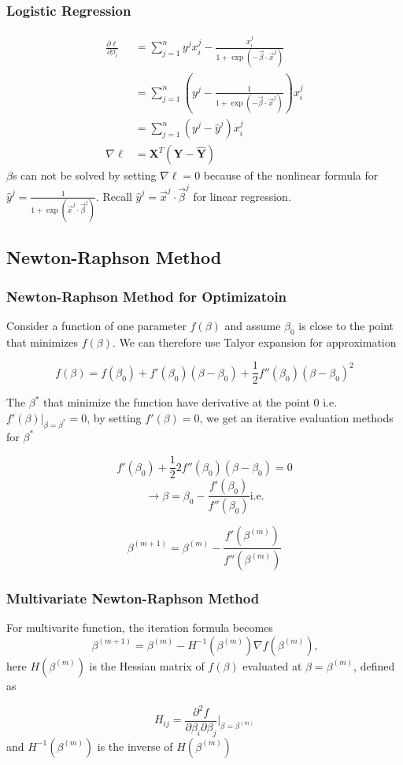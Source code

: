 \documentclass[notheorems, aspectratio=54]{beamer}
\begin{document}
\begin{frame}

\frametitle{Logistic Regression}
\begin{align*}
\frac{\partial\ell}{\partial\beta_i}
&=\sum_{j=1}^{n}y^jx_{i}^{j}-\frac{x_{i}^j}{1+\exp(-\vec{\beta}\cdot\vec{x}^j)}\\
&=\sum_{j=1}^{n}\left (y^j-\frac{1}{1+\exp(-\vec{\beta}\cdot\vec{x}^j)} \right ) x_{i}^{j}\\
&=\sum_{j=1}^{n}\left (y^j-\hat{y}^j \right ) x_{i}^{j}\\
\nabla\ell&=\textbf{X}^T(\textbf{Y}-\hat{\textbf{Y}})
\end{align*}
$\beta$s can not be solved by setting $\nabla\ell=0$ because of the nonlinear formula for $\hat{y}^j=\frac{1}{1+\exp(\vec{x}^j\cdot\vec{\beta}^j)}$. Recall $\hat{y}^j=\vec{x}^j\cdot\vec{\beta}^j$ for linear regression.
\end{frame}

\begin{frame}

\subsection{Newton-Raphson Method}

\frametitle{Newton-Raphson Method for Optimizatoin}
Consider a function of one parameter $f(\beta)$ and assume $\beta_0$ is close to the point that minimizes $f(\beta)$. We can therefore use Talyor expansion for approximation

$$
f(\beta)=f(\beta_0)+f'(\beta_0)(\beta-\beta_0)+\frac{1}{2}f''(\beta_0)(\beta-\beta_0)^2
$$

The $\beta^*$ that minimize the function have derivative at the point 0 i.e. $f'(\beta)|_{\beta=\beta^*}=0$, by setting $f'(\beta)=0$, we get an iterative evaluation methods for $\beta^*$

$$
f'(\beta_0)+\frac{1}{2}2f''(\beta_0)(\beta-\beta_0)=0 
$$
$$
\rightarrow
\beta=\beta_0-\frac{f'(\beta_0)}{f''(\beta_0)} \text{i.e.}
$$

$$
\beta^{(m+1)}=\beta^{(m)}-\frac{f'(\beta^{(m)})}{f''(\beta^{(m)})}
$$
\end{frame}

\begin{frame}
\frametitle{Multivariate Newton-Raphson Method }
For multivarite function, the iteration formula becomes
$$
\beta^{(m+1)}=\beta^{(m)}-H^{-1}(\beta^{(m)})\nabla f(\beta^{(m)})\text{,}
$$
here $H(\beta^{(m)})$ is the Hessian matrix of $f(\beta)$ evaluated at $\beta=\beta^{(m)}$, defined as

$$
H_{ij}=\frac{\partial^2f}{\partial\beta_i\partial\beta_j}|_{\beta=\beta^{(m)}}
$$
and $H^{-1}(\beta^{(m)})$ is the inverse of $H(\beta^{(m)})$

\end{frame}
\end{document}
